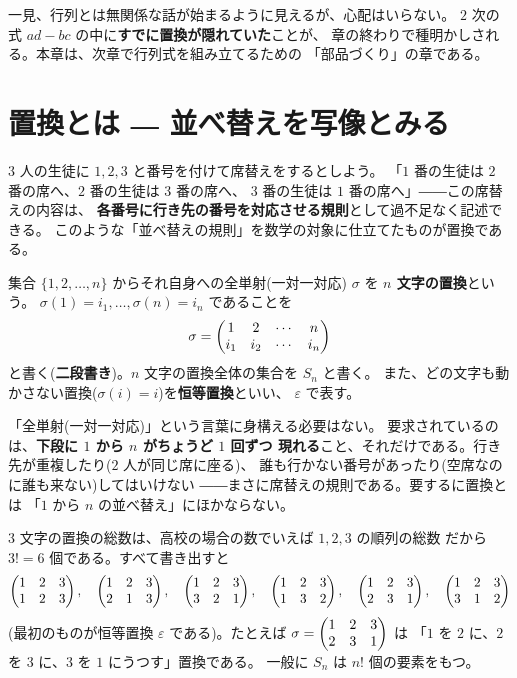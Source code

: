一見、行列とは無関係な話が始まるように見えるが、心配はいらない。
$2$ 次の式 $ad - bc$ の中に\textbf{すでに置換が隠れていた}ことが、
章の終わりで種明かしされる。本章は、次章で行列式を組み立てるための
「部品づくり」の章である。

\section{置換とは ― 並べ替えを写像とみる}

$3$ 人の生徒に $1, 2, 3$ と番号を付けて席替えをするとしよう。
「$1$ 番の生徒は $2$ 番の席へ、$2$ 番の生徒は $3$ 番の席へ、
$3$ 番の生徒は $1$ 番の席へ」――この席替えの内容は、
\textbf{各番号に行き先の番号を対応させる規則}として過不足なく記述できる。
このような「並べ替えの規則」を数学の対象に仕立てたものが置換である。

\begin{teigi}[置換]
集合 $\{1, 2, \dots, n\}$ からそれ自身への全単射(一対一対応)
$\sigma$ を \textbf{$n$ 文字の置換}という。
$\sigma(1) = i_1, \dots, \sigma(n) = i_n$ であることを
\[
\sigma = \begin{pmatrix}1 & 2 & \cdots & n \\ i_1 & i_2 & \cdots & i_n\end{pmatrix}
\]
と書く(\textbf{二段書き})。$n$ 文字の置換全体の集合を $S_n$ と書く。
また、どの文字も動かさない置換($\sigma(i) = i$)を\textbf{恒等置換}といい、
$\varepsilon$ で表す。
\end{teigi}

「全単射(一対一対応)」という言葉に身構える必要はない。
要求されているのは、\textbf{下段に $1$ から $n$ がちょうど $1$ 回ずつ
現れる}こと、それだけである。行き先が重複したり($2$ 人が同じ席に座る)、
誰も行かない番号があったり(空席なのに誰も来ない)してはいけない
――まさに席替えの規則である。要するに置換とは
「$1$ から $n$ の並べ替え」にほかならない。

\begin{rei}[$S_3$ のすべての置換]
$3$ 文字の置換の総数は、高校の場合の数でいえば $1, 2, 3$ の順列の総数
だから $3! = 6$ 個である。すべて書き出すと
\[
\begin{pmatrix}1 & 2 & 3 \\ 1 & 2 & 3\end{pmatrix}, \quad
\begin{pmatrix}1 & 2 & 3 \\ 2 & 1 & 3\end{pmatrix}, \quad
\begin{pmatrix}1 & 2 & 3 \\ 3 & 2 & 1\end{pmatrix}, \quad
\begin{pmatrix}1 & 2 & 3 \\ 1 & 3 & 2\end{pmatrix}, \quad
\begin{pmatrix}1 & 2 & 3 \\ 2 & 3 & 1\end{pmatrix}, \quad
\begin{pmatrix}1 & 2 & 3 \\ 3 & 1 & 2\end{pmatrix}
\]
(最初のものが恒等置換 $\varepsilon$ である)。たとえば
$\sigma = \begin{pmatrix}1 & 2 & 3 \\ 2 & 3 & 1\end{pmatrix}$ は
「$1$ を $2$ に、$2$ を $3$ に、$3$ を $1$ にうつす」置換である。
一般に $S_n$ は $n!$ 個の要素をもつ。
\end{rei}


